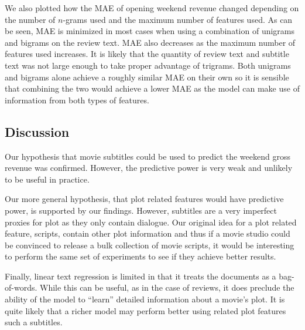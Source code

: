 \documentclass[11pt]{article}
\begin{document}
We also plotted how the MAE of opening weekend revenue changed depending on the number
of $n$-grams used and the maximum number of features used. As can be seen, MAE is minimized
in most cases when using a combination of unigrams and bigrams on the review text. MAE
also decreases as the maximum number of features used increases. It is likely that the
quantity of review text and subtitle text was not large enough to take proper advantage
of trigrams. Both unigrams and bigrams alone achieve a roughly similar MAE on their own
so it is sensible that combining the two would achieve a lower MAE as the model can make
use of information from both types of features.

\subsection{Discussion}
Our hypothesis that movie subtitles could be used to predict the weekend gross revenue
was confirmed. However, the predictive power is very weak and unlikely to be useful in practice. 

Our more general hypothesis, that plot related features would have predictive power,
is supported by our findings.  However, subtitles are a very imperfect proxies for plot
as they only contain dialogue. Our original idea for a plot related feature, scripts,
contain other plot information and thus if a movie studio could be convinced to release a
bulk collection of movie scripts, it would be interesting to perform the same set of
experiments to see if they achieve better results.

Finally, linear text regression is limited in that it treats the documents as a bag-of-words.
While this can be useful, as in the case of reviews, it does preclude the ability
of the model to ``learn'' detailed information about a movie's plot. It is quite likely that
a richer model may perform better using related plot features such a subtitles.
\end{document}
